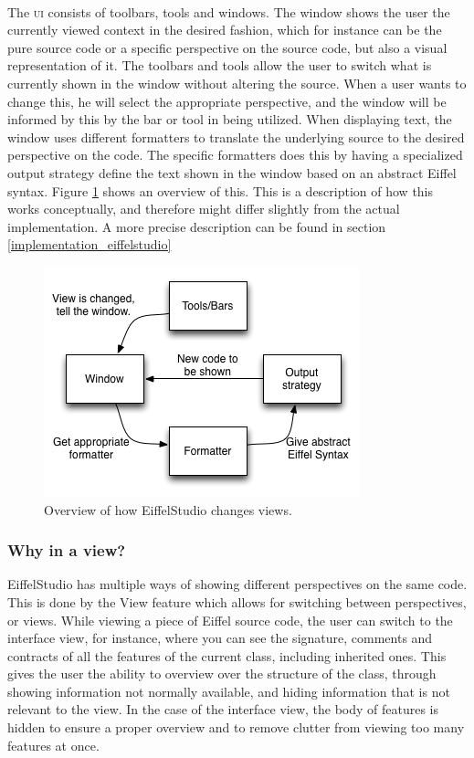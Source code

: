 \paragraph{}
The \textsc{ui} consists of toolbars, tools and windows. The window shows the user the currently viewed context in the desired fashion, which for instance can be the pure source code or a specific perspective on the source code, but also a visual representation of it. The toolbars and tools allow the user to switch what is currently shown in the window without altering the source. When a user wants to change this, he will select the appropriate perspective, and the window will be informed by this by the bar or tool in being utilized. When displaying text, the window uses different formatters to translate the underlying source to the desired perspective on the code. The specific formatters does this by having a specialized output strategy define the text shown in the window based on an abstract Eiffel syntax. Figure \ref{fig:eiffelstudio_view_change} shows an overview of this. This is a description of how this works conceptually, and therefore might differ slightly from the actual implementation. A more precise description can be found in section \ref{implementation_eiffelstudio}

\begin{figure}[H]
\centerline{
\includegraphics[scale=0.7]{images/eiffel_view_text_design.png}
}
\caption[EiffelStudio view control]{Overview of how EiffelStudio changes views.}
\label{fig:eiffelstudio_view_change}
\end{figure}

\subsubsection{Why in a view?}
\label{why_a_view}
EiffelStudio has multiple ways of showing different perspectives on the same code. This is done by the View feature which allows for switching between perspectives, or views. While viewing a piece of Eiffel source code, the user can switch to the interface view, for instance, where you can see the signature, comments and contracts of all the features  of the current class, including inherited ones. This gives the user the ability to overview over the structure of the class, through showing information not normally available, and hiding information that is not relevant to the view. In the case of the interface view, the body of features is hidden to ensure a proper overview and to remove clutter from viewing too many features at once.
